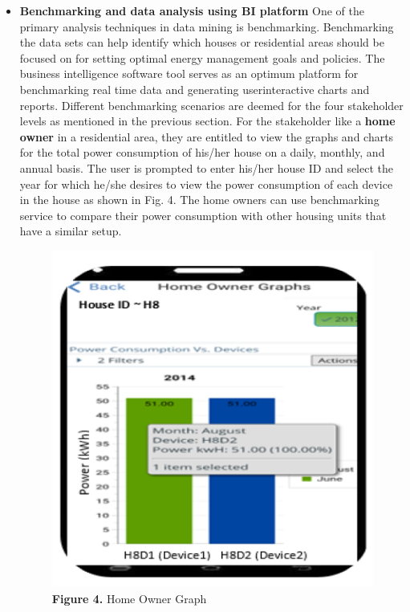\documentclass[a4paper,12pt,oneside]{article}
\let\counterwithin\relax
\begin{document}
\begin{itemize}
    \item \textbf{Benchmarking and data analysis using BI platform}
    \newline
    One of the primary analysis techniques in data mining is
    benchmarking. Benchmarking the data sets can help identify which houses or residential areas should be focused on for
    setting optimal energy management goals and policies. The
    business intelligence software tool serves as an optimum
    platform for benchmarking real time data and generating userinteractive
    charts and reports. Different benchmarking
    scenarios are deemed for the four stakeholder levels as
    mentioned in the previous section. 
    \newpage
    For the stakeholder like a \textbf{home owner} in a residential area, they are entitled to view the
    graphs and charts for the total power consumption of his/her
    house on a daily, monthly, and annual basis. The user is
    prompted to enter his/her house ID and select the year for
    which he/she desires to view the power consumption of each
    device in the house as shown in Fig. 4. The home owners can
    use benchmarking service to compare their power
    consumption with other housing units that have a similar
    setup.
    \newline
        \begin{figure}[H]
        \includegraphics{Figure4.png}
        \centering
        \caption{\textbf{Figure 4.} Home Owner Graph}

\end{figure}
\end{itemize}
\end{document}
